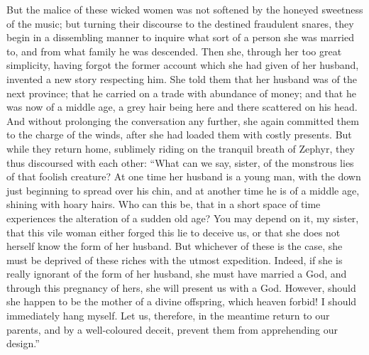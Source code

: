 \documentclass{article}
\begin{document}
But the malice of these wicked women was not softened by the honeyed sweetness
of the music; but turning their discourse to the destined fraudulent snares,
they begin in a dissembling manner to inquire what sort of a person she was
married to, and from what family he was descended. Then she, through her too
great simplicity, having forgot the former account which she had given of her
husband, invented a new story respecting him. She told them that her husband
was of the next province; that he carried on a trade with abundance of money;
and that he was now of a middle age, a grey hair being here and there scattered
on his head. And without prolonging the conversation any further, she again
committed them to the charge of the winds, after she had loaded them with
costly presents. But while they return home, sublimely riding on the tranquil
breath of Zephyr, they thus discoursed with each other: ``What can we say,
sister, of the monstrous lies of that foolish creature? At one time her husband
is a young man, with the down just beginning to spread over his chin, and at
another time he is of a middle age, shining with hoary hairs. Who can this be,
that in a short space of time experiences the alteration of a sudden old age?
You may depend on it, my sister, that this vile woman either forged this lie to
deceive us, or that she does not herself know the form of her husband. But
whichever of these is the case, she must be deprived of these riches with the
utmost expedition. Indeed, if she is really ignorant of the form of her
husband, she must have married a God, and through this pregnancy of hers, she
will present us with a God. However, should she happen to be the mother of a
divine offspring, which heaven forbid! I should immediately hang myself. Let
us, therefore, in the meantime return to our parents, and by a well-coloured
deceit, prevent them from apprehending our design.''
\end{document}
